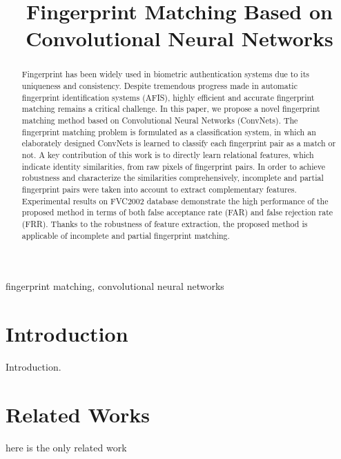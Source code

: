 \documentclass[conference]{IEEEtran}
\begin{document}
\title{Fingerprint Matching Based on Convolutional Neural Networks}
\author{
\and
{}
}

\maketitle

\begin{abstract}
Fingerprint has been widely used in biometric authentication systems due to its uniqueness and consistency. Despite tremendous progress made in automatic fingerprint identification systems (AFIS), highly efficient and accurate fingerprint matching remains a critical challenge. In this paper, we propose a novel fingerprint matching method based on Convolutional Neural Networks (ConvNets). The fingerprint matching problem is formulated as a classification system, in which an elaborately designed ConvNets is learned to classify each fingerprint pair as a match or not. A key contribution of this work is to directly learn relational features, which indicate identity similarities, from raw pixels of fingerprint pairs. In order to achieve robustness and characterize the similarities comprehensively, incomplete and partial fingerprint pairs were taken into account to extract complementary features. Experimental results on FVC2002 database demonstrate the high performance of the proposed method in terms of both false acceptance rate (FAR) and false rejection rate (FRR). Thanks to the robustness of feature extraction, the proposed method is applicable of incomplete and partial fingerprint matching.
\end{abstract}

\begin{IEEEkeywords}
fingerprint matching, convolutional neural networks
\end{IEEEkeywords}

\section{Introduction}
Introduction.

\section{Related Works}

here is the only related work \cite{mainRef}

\end{document}
